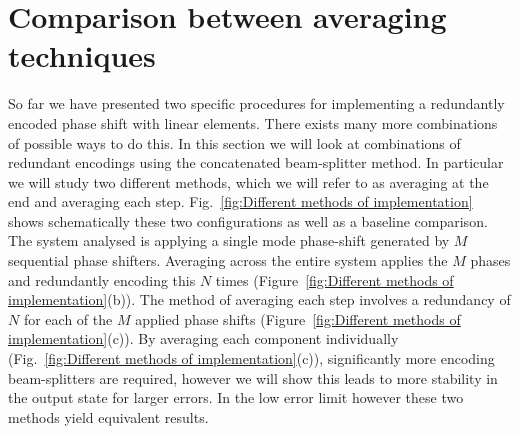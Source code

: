 \documentclass[aps,pra,twocolumn,superscriptaddress,numerical,floatfix]{revtex4-1}
\begin{document}
\section{Comparison between averaging techniques \label{averaging at end vs step}}

So far we have presented two specific procedures for implementing a redundantly encoded phase shift with linear elements.  There exists many more combinations of possible ways to do this.  In this section we will look at combinations of redundant encodings using the concatenated beam-splitter method.  In particular we will study two different methods, which we will refer to as averaging at the end and averaging each step. Fig.~\ref{fig:Different methods of implementation} shows schematically these two configurations as well as a baseline comparison. The system analysed is applying a single mode phase-shift generated by $M$ sequential phase shifters.  Averaging across the entire system applies the $M$ phases and redundantly encoding this $N$ times (Figure~\ref{fig:Different methods of implementation}(b)). The method of averaging each step involves a redundancy of $N$ for each of the $M$ applied phase shifts (Figure~\ref{fig:Different methods of implementation}(c)).  By averaging each component individually (Fig.~\ref{fig:Different methods of implementation}(c)), significantly more encoding beam-splitters are required, however we will show this leads to more stability in the output state for larger errors. In the low error limit however these two methods yield equivalent results.
\end{document}
